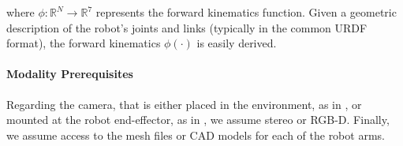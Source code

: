 where $\phi: \mathbb{R}^N\rightarrow\mathbb{R}^{7}$ represents the forward kinematics function. Given a geometric description of the robot's joints and links (typically in the common URDF format), the forward kinematics $\phi(\cdot)$ is easily derived.

\paragraph{Modality Prerequisites} Regarding the camera, that is either placed in the environment, as in , or mounted at the robot end-effector, as in , we assume stereo or RGB-D. Finally, we assume access to the mesh files or CAD models for each of the robot arms.






